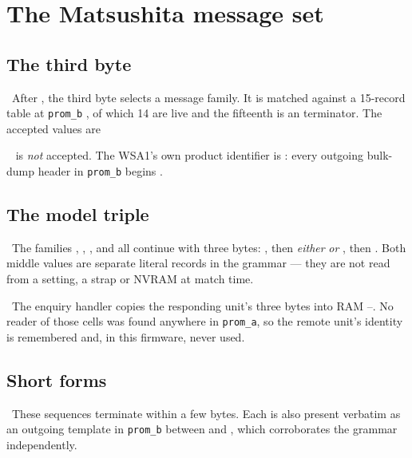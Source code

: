 \chapter{The Matsushita message set}

\section{The third byte}
\estab\ After , the third byte selects a message family. It is matched
against a 15-record table at \texttt{prom\_b} , of which 14 are live and
the fifteenth is an  terminator. The accepted values are

\begin{center}
\end{center}

\estab\  is \emph{not} accepted. The WSA1's own product identifier is
: every outgoing bulk-dump header in \texttt{prom\_b} begins
.

\section{The model triple}
\estab\ The families , , ,  and
 all continue with three bytes: , then \emph{either} 
\emph{or} , then . Both middle values are separate literal records
in the grammar --- they are not read from a setting, a strap or NVRAM at match time.

\estab\ The enquiry handler copies the responding unit's three bytes into RAM
--. No reader of those cells was found anywhere in
\texttt{prom\_a}, so the remote unit's identity is remembered and, in this firmware,
never used.

\section{Short forms}
\estab\ These sequences terminate within a few bytes. Each is also present verbatim as an
outgoing template in \texttt{prom\_b} between  and , which
corroborates the grammar independently.

